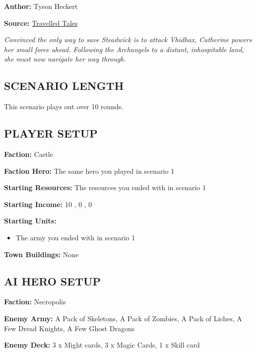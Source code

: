 
\begin{multicols*}{2}

\textbf{Author:} Tyson Heckert

\textbf{Source:} \href{https://travelledtales.com}{Travelled Tales}

\textit{Convinced the only way to save Steadwick is to attack Vhidhax, Catherine powers her small force ahead. 
Following the Archangels to a distant, inhospitable land, she must now navigate her way through.}

\subsection*{\MakeUppercase{Scenario length}}

This scenario plays out over 10 rounds.

\subsection*{\MakeUppercase{Player setup}}

\textbf{Faction:} Castle

\textbf{Faction Hero:} The same hero you played in scenario 1

\textbf{Starting Resources:} The resources you ended with in scenario 1

\textbf{Starting Income:} 10 , 0 , 0 

\textbf{Starting Units:}
\begin{itemize}
  \item The army you ended with in scenario 1
\end{itemize}

\textbf{Town Buildings:} None

\subsection*{\MakeUppercase{AI hero setup}}

\textbf{Faction:} Necropolis

\textbf{Enemy Army:} A Pack of Skeletons, A Pack of Zombies, A Pack of Liches, A Few Dread Knights, A Few Ghost Dragons

\textbf{Enemy Deck:} 3 x Might cards, 3 x Magic Cards, 1 x Skill card


\end{multicols*}
